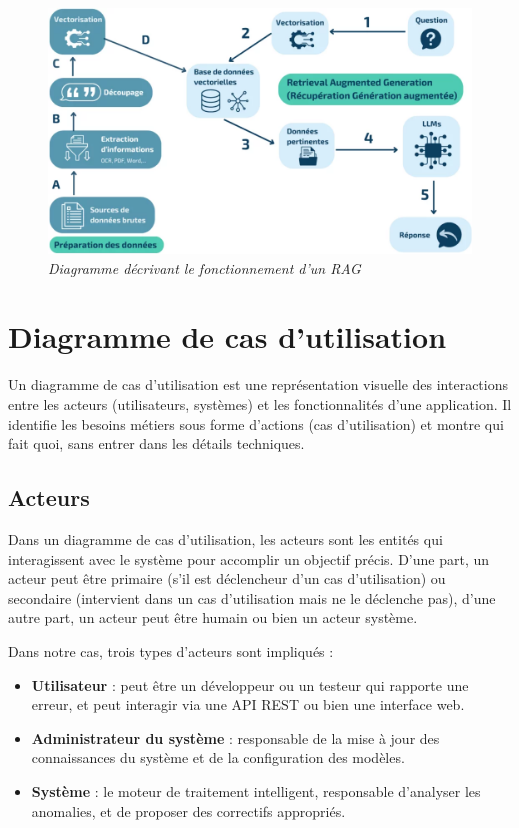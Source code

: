 \documentclass[12pt,a4paper]{report}
\begin{document}
	\begin{figure}[H]
		\centering
		\includegraphics[width=1\textwidth]{diagramme-rag.png}
		\caption{\textit{Diagramme décrivant le fonctionnement d'un RAG}}
		\label{fig:diagramme-rag}
	\end{figure}
	
	\section{Diagramme de cas d'utilisation}
	
	Un diagramme de cas d'utilisation est une représentation visuelle des interactions entre les acteurs (utilisateurs, systèmes) et les fonctionnalités d'une application. Il identifie les besoins métiers sous forme d'actions (cas d’utilisation) et montre qui fait quoi, sans entrer dans les détails techniques.
	
	\subsection{Acteurs}
	
	Dans un diagramme de cas d'utilisation, les acteurs sont les entités qui interagissent avec le système pour accomplir un objectif précis. D'une part, un acteur peut être primaire (s'il est déclencheur d'un cas d'utilisation) ou secondaire (intervient dans un cas d'utilisation mais ne le déclenche pas), d'une autre part, un acteur peut être humain ou bien un acteur système.
	
	Dans notre cas, trois types d'acteurs sont impliqués  :
	
	\begin{itemize}
		\item \textbf{Utilisateur} : peut être un développeur ou un testeur qui rapporte une erreur, et peut interagir via une API REST ou bien une interface web.
		
		\item \textbf{Administrateur du système} : responsable de la mise à jour des connaissances du système et de la configuration des modèles.
		
		\item \textbf{Système} : le moteur de traitement intelligent, responsable d'analyser les anomalies, et de proposer des correctifs appropriés.
	\end{itemize}
	
\end{document}
